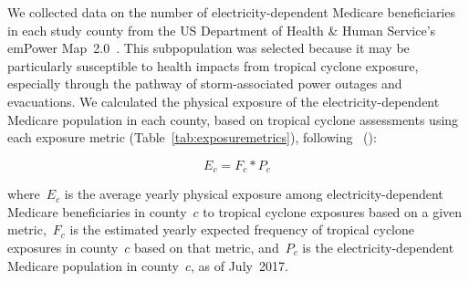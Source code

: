 We collected data on the number of electricity-dependent Medicare beneficiaries
in each study county from the \ac{US} Department of Health \& Human Service's
emPower Map~2.0~\parencite{empower}. This subpopulation was selected because it
may be particularly susceptible to health impacts from tropical cyclone
exposure, especially through the pathway of storm-associated power outages and
evacuations. We calculated the physical exposure of the electricity-dependent
Medicare population in each county, based on tropical cyclone assessments using
each exposure metric (Table~\ref{tab:exposuremetrics}), following
\citeauthor*{peduzzi2009assessing}~(\citeyear{peduzzi2009assessing}):

\begin{equation}
E_c = F_c * P_c
\end{equation}

\noindent where~$E_c$ is the average yearly physical exposure among
electricity-dependent Medicare beneficiaries in county~$c$ to tropical cyclone
exposures based on a given metric,~$F_c$ is the estimated yearly expected
frequency of tropical cyclone exposures in county~$c$ based on that metric,
and~$P_c$ is the electricity-dependent Medicare population in
county~$c$, as of July~2017. 




